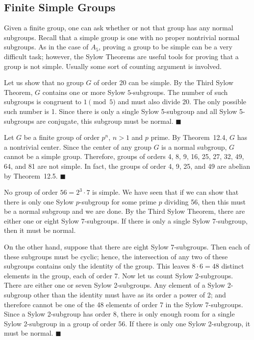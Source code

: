  
 
\subsection*{Finite Simple Groups}
 
 
Given a finite group, one can ask whether or not that group has any
normal subgroups. Recall that a simple group is one with no proper
nontrivial normal subgroups. As in the case of $A_5$, proving a group
to be simple can be a very difficult task; however, the Sylow Theorems
are useful tools for proving that a group is not simple. Usually
some sort of counting argument is involved.
 
 
\medskip
 
 
Let us show that no group $G$ of order 20 can be simple.  By the Third
Sylow Theorem, $G$ contains one or more Sylow $5$-subgroups. The number
of such subgroups is congruent to $1 \pmod{5}$ and must also divide
20.  The only possible such number is 1.  Since there is only a
single Sylow 5-subgroup and all Sylow 5-subgroups are conjugate, this
subgroup must be normal. 
\hspace{\fill} $\blacksquare$
 
 
\medskip
 
 
Let $G$ be a finite group of order $p^n$, $n>1$ and $p$ prime.  By 
Theorem~12.4, $G$ has a nontrivial center. Since the center of any
group $G$ is a normal subgroup, $G$ cannot be a simple group.
Therefore, groups of orders 4, 8, 9, 16, 25, 27, 32, 49, 64, and 81
are not simple.  In fact, the groups of order 4, 9, 25, and 49 are 
abelian by Theorem~12.5.
\hspace{\fill} $\blacksquare$
 
 
\medskip
 
 
No group of order $56= 2^3 \cdot 7$ is simple.  We have seen that if
we can show that there is only one Sylow $p$-subgroup for some prime
$p$ dividing 56, then this must be a normal subgroup and we are done.
By the Third Sylow Theorem, there are either one or eight Sylow
7-subgroups.  If there is only a single Sylow 7-subgroup, then it must
be normal.  
 
 
On the other hand, suppose that there are eight Sylow 7-subgroups.
Then each of these subgroups must be cyclic; hence, the intersection
of any two of these subgroups contains only the identity of the group.
This leaves $8 \cdot 6 = 48$ distinct elements in the group, each of
order 7. Now let us count Sylow 2-subgroups. There are either one or
seven Sylow 2-subgroups.  Any element of a Sylow 2-subgroup other than
the identity must have as its order a  power of 2; and therefore
cannot be
one of the 48 elements of order 7 in the Sylow 7-subgroups. Since a
Sylow 2-subgroup has order 8, there is only enough room for a single
Sylow 2-subgroup in a group of order 56.  If there is only one Sylow
2-subgroup, it must be normal. 
\hspace{\fill} $\blacksquare$
 
